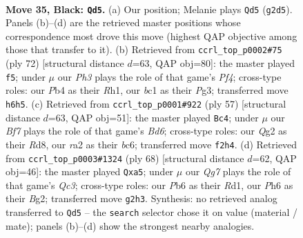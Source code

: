 \documentclass[11pt]{article}
\begin{document}
\clearpage

\begin{figure}[p]\centering
\begin{subfigure}{0.46\textwidth}\centering
\resizebox{\linewidth}{!}{%
\newchessgame
\chessboard[
  setfen={7r/r3k3/1pp1p1pp/6P1/Pp1P4/1P1KP3/R3Qbq1/2B5 b - - 1 35},
  showmover=false,
  pgfstyle=straightmove, color=movearrow, markmove={g2-d5}
]}
\caption{}
\end{subfigure}\hfill
\begin{subfigure}{0.46\textwidth}\centering
\resizebox{\linewidth}{!}{%
\newchessgame
\chessboard[
  setfen={7k/3q2rp/4p1B1/3pP3/pbp2PQ1/6P1/PP4K1/7R w - - 4 37},
  showmover=false,
  pgfstyle=straightmove, color=movearrow, markmove={f4-f5}
]}
\caption{}
\end{subfigure}
\\[4pt]
\begin{subfigure}{0.46\textwidth}\centering
\resizebox{\linewidth}{!}{%
\newchessgame
\chessboard[
  setfen={3r2k1/5pp1/1pB1p3/4P2p/5PPq/3b1Q1P/PP6/3R2K1 b - - 3 29},
  showmover=false,
  pgfstyle=straightmove, color=movearrow, markmove={d3-c4}
]}
\caption{}
\end{subfigure}\hfill
\begin{subfigure}{0.46\textwidth}\centering
\resizebox{\linewidth}{!}{%
\newchessgame
\chessboard[
  setfen={2r3k1/3n1pp1/2q3p1/p2p4/P1P1p3/2Q1P1PP/5PB1/3R2K1 w - - 4 35},
  showmover=false,
  pgfstyle=straightmove, color=movearrow, markmove={c3-a5}
]}
\caption{}
\end{subfigure}
\caption{\textbf{Move 35, Black: \texttt{Qd5}.} (a) Our position; Melanie plays \texttt{Qd5} (\texttt{g2d5}). Panels (b)--(d) are the retrieved master positions whose correspondence most drove this move (highest QAP objective among those that transfer to it). (b) Retrieved from \texttt{ccrl\_top\_p0002\#75} (ply 72) [structural distance $d$=63, QAP obj=80]: the master played \texttt{f5}; under $\mu$ our \emph{Ph3} plays the role of that game's \emph{Pf4}; cross-type roles: our \emph{P}b4 as their \emph{R}h1, our \emph{b}c1 as their \emph{P}g3; transferred move \texttt{h6h5}. (c) Retrieved from \texttt{ccrl\_top\_p0001\#922} (ply 57) [structural distance $d$=63, QAP obj=51]: the master played \texttt{Bc4}; under $\mu$ our \emph{Bf7} plays the role of that game's \emph{Bd6}; cross-type roles: our \emph{Q}g2 as their \emph{R}d8, our \emph{r}a2 as their \emph{b}c6; transferred move \texttt{f2h4}. (d) Retrieved from \texttt{ccrl\_top\_p0003\#1324} (ply 68) [structural distance $d$=62, QAP obj=46]: the master played \texttt{Qxa5}; under $\mu$ our \emph{Qg7} plays the role of that game's \emph{Qc3}; cross-type roles: our \emph{P}b6 as their \emph{R}d1, our \emph{P}h6 as their \emph{B}g2; transferred move \texttt{g2h3}. Synthesis: no retrieved analog transferred to \texttt{Qd5} -- the \texttt{search} selector chose it on value (material / mate); panels (b)--(d) show the strongest nearby analogies.}
\label{fig:thought-m69}
\end{figure}
\end{document}

